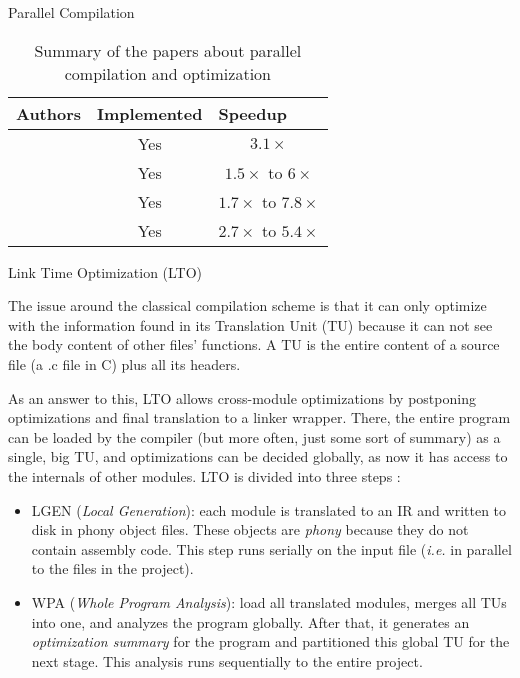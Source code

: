 \begin{section}{Parallel Compilation}
\begin{table}[]
\begin{tabular}{|l|c|c|}
\hline
Authors      & \multicolumn{1}{l|}{Implemented} & \multicolumn{1}{l|}{Speedup} \\ \hline
 \cite{vandevoorde1988parallel} & Yes                              & $3.1\times$                         \\ \hline
 \cite{wortman1992}     & Yes                              & $1.5\times$ to $6\times$                   \\ \hline
 \cite{Lee1994}         & Yes                               & $1.7\times$ to $7.8\times$                 \\ \hline
 \cite{kramer1994combining}     & Yes                               & $2.7\times$ to $5.4\times$                 \\ \hline
\end{tabular}
\caption{Summary of the papers about parallel compilation and optimization}
\label{table:parallel_comp_opt}
\end{table}

\begin{subsection}{Link Time Optimization (LTO)}\label{lto_section}

The issue around the classical compilation scheme is that it can only optimize with
the information found in its Translation Unit (TU) because it can not see the body
content of other files' functions. A TU is the
entire content of a source file (a .c file in C) plus all its headers.

As an answer to this, LTO allows cross-module optimizations by
postponing optimizations and final translation to a linker wrapper. There, the entire
program can be loaded by the compiler (but more often, just some sort of summary)
as a single, big TU, and optimizations can be decided globally,
as now it has access to the internals of other modules. LTO is divided into
three steps \citep{whoprgoogle,glek2010optimizing}:
\begin{itemize}
\item LGEN (\textit{Local Generation}): each module is translated to an IR and
written to disk in phony object files. These objects are \emph{phony} because
they do not contain assembly code. This step runs serially on the input file
(\textit{i.e.} in parallel to the files in the project).

\item WPA (\textit{Whole Program Analysis}): load all translated modules,
merges all TUs into one, and analyzes the program globally. After that, it
generates an \emph{optimization summary} for the program and partitioned this
global TU for the next stage. This analysis runs sequentially to the entire
project.


\end{itemize}
\end{subsection}
\end{section}
